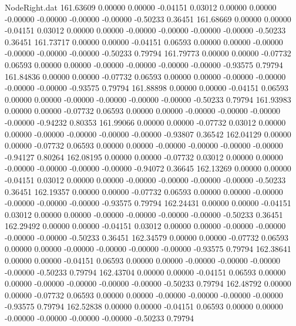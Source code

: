 \begin{filecontents}{NodeRight.dat}
 161.63609    0.00000    0.00000    -0.04151    0.03012    0.00000    0.00000   -0.00000   -0.00000   -0.00000   -0.00000   -0.50233    0.36451
 161.68669    0.00000    0.00000    -0.04151    0.03012    0.00000    0.00000   -0.00000   -0.00000   -0.00000   -0.00000   -0.50233    0.36451
 161.73717    0.00000    0.00000    -0.04151    0.06593    0.00000    0.00000   -0.00000   -0.00000   -0.00000   -0.00000   -0.50233    0.79794
 161.79773    0.00000    0.00000    -0.07732    0.06593    0.00000    0.00000   -0.00000   -0.00000   -0.00000   -0.00000   -0.93575    0.79794
 161.84836    0.00000    0.00000    -0.07732    0.06593    0.00000    0.00000   -0.00000   -0.00000   -0.00000   -0.00000   -0.93575    0.79794
 161.88898    0.00000    0.00000    -0.04151    0.06593    0.00000    0.00000   -0.00000   -0.00000   -0.00000   -0.00000   -0.50233    0.79794
 161.93983    0.00000    0.00000    -0.07732    0.06593    0.00000    0.00000   -0.00000   -0.00000   -0.00000   -0.00000   -0.94232    0.80353
 161.99066    0.00000    0.00000    -0.07732    0.03012    0.00000    0.00000   -0.00000   -0.00000   -0.00000   -0.00000   -0.93807    0.36542
 162.04129    0.00000    0.00000    -0.07732    0.06593    0.00000    0.00000   -0.00000   -0.00000   -0.00000   -0.00000   -0.94127    0.80264
 162.08195    0.00000    0.00000    -0.07732    0.03012    0.00000    0.00000   -0.00000   -0.00000   -0.00000   -0.00000   -0.94072    0.36645
 162.13269    0.00000    0.00000    -0.04151    0.03012    0.00000    0.00000   -0.00000   -0.00000   -0.00000   -0.00000   -0.50233    0.36451
 162.19357    0.00000    0.00000    -0.07732    0.06593    0.00000    0.00000   -0.00000   -0.00000   -0.00000   -0.00000   -0.93575    0.79794
 162.24431    0.00000    0.00000    -0.04151    0.03012    0.00000    0.00000   -0.00000   -0.00000   -0.00000   -0.00000   -0.50233    0.36451
 162.29492    0.00000    0.00000    -0.04151    0.03012    0.00000    0.00000   -0.00000   -0.00000   -0.00000   -0.00000   -0.50233    0.36451
 162.34579    0.00000    0.00000    -0.07732    0.06593    0.00000    0.00000   -0.00000   -0.00000   -0.00000   -0.00000   -0.93575    0.79794
 162.38641    0.00000    0.00000    -0.04151    0.06593    0.00000    0.00000   -0.00000   -0.00000   -0.00000   -0.00000   -0.50233    0.79794
 162.43704    0.00000    0.00000    -0.04151    0.06593    0.00000    0.00000   -0.00000   -0.00000   -0.00000   -0.00000   -0.50233    0.79794
 162.48792    0.00000    0.00000    -0.07732    0.06593    0.00000    0.00000   -0.00000   -0.00000   -0.00000   -0.00000   -0.93575    0.79794
 162.52838    0.00000    0.00000    -0.04151    0.06593    0.00000    0.00000   -0.00000   -0.00000   -0.00000   -0.00000   -0.50233    0.79794

\end{filecontents}
